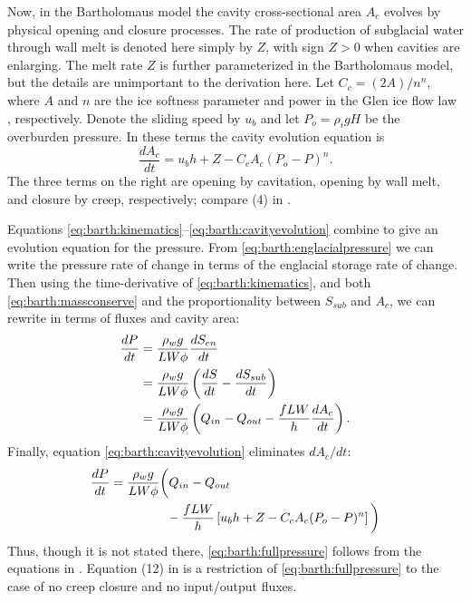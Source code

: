\documentclass[review,letterpaper]{igs}
\begin{document}
Now, in the Bartholomaus model the cavity cross-sectional area $A_c$ evolves by physical opening and closure processes.  The rate of production of subglacial water through wall melt is denoted here simply by $Z$, with sign $Z>0$ when cavities are enlarging.  The melt rate $Z$ is further parameterized in the Bartholomaus model, but the details are unimportant to the derivation here.  Let $C_c = (2 A)/n^n$, where $A$ and $n$ are the ice softness parameter and power in the Glen ice flow law \citep{CuffeyPaterson}, respectively.  Denote the sliding speed by $u_b$ and let $P_o=\rho_i g H$ be the overburden pressure.  In these terms the cavity evolution equation is
\begin{equation}
\frac{dA_c}{dt} = u_b h + Z - C_c A_c (P_o-P)^n.  \label{eq:barth:cavityevolution}
\end{equation}
The three terms on the right are opening by cavitation, opening by wall melt, and closure by creep, respectively; compare (4) in \cite{Bartholomausetal2011}.

Equations \eqref{eq:barth:kinematics}--\eqref{eq:barth:cavityevolution} combine to give an evolution equation for the pressure.  From \eqref{eq:barth:englacialpressure} we can write the pressure rate of change in terms of the englacial storage rate of change.  Then using the time-derivative of \eqref{eq:barth:kinematics}, and both \eqref{eq:barth:massconserve} and the proportionality between $S_{sub}$ and $A_c$, we can rewrite in terms of fluxes and cavity area:
\begin{align}
\frac{dP}{dt} &= \frac{\rho_w g}{L W \phi} \frac{d S_{en}}{dt} \\
&= \frac{\rho_w g}{L W \phi} \left(\frac{d S}{dt} - \frac{d S_{sub}}{dt}\right) \notag \\
&= \frac{\rho_w g}{L W \phi} \left(Q_{in} - Q_{out} - \frac{f L W}{h} \frac{d A_c}{dt}\right). \notag
\end{align}
Finally, equation \eqref{eq:barth:cavityevolution} eliminates $dA_c/dt$:
\begin{align}
&\frac{dP}{dt} = \frac{\rho_w g}{L W \phi} \bigg(Q_{in} - Q_{out} \label{eq:barth:fullpressure} \\
&\qquad \qquad \qquad - \frac{f L W}{h} \left[u_b h + Z - C_c A_c (P_o-P)^n\right]\bigg) \notag
\end{align}
Thus, though it is not stated there, \eqref{eq:barth:fullpressure} follows from the equations in \cite{Bartholomausetal2011}.  Equation (12) in \cite{Bartholomausetal2011} is a restriction of \eqref{eq:barth:fullpressure} to the case of no creep closure and no input/output fluxes.
\end{document}
